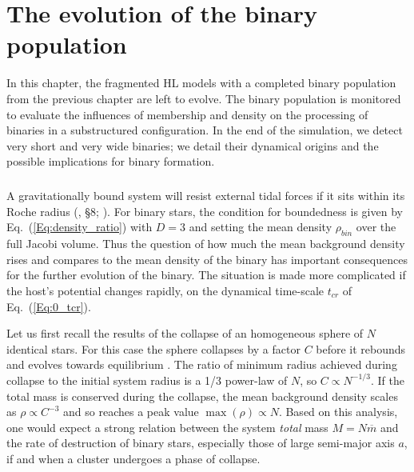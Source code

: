 \chapter{The evolution of the binary population}


In this chapter, the fragmented HL models with a completed binary population from the previous chapter are left to evolve. The binary population is monitored to evaluate the influences of membership and density on the processing of binaries in a substructured configuration. In the end of the simulation, we detect very short and very wide binaries; we detail their dynamical origins and the possible implications for binary formation.

\minitoc


\paragraph*{}

A gravitationally bound system will resist external tidal forces if it sits within its Roche radius (\citealt{BT}, \S8; \citealt{Renaud2011}). For binary stars, the condition for boundedness is given by Eq.~(\ref{Eq:density_ratio})  with $D = 3$ and setting the mean density $\rho_{bin}$ over the full Jacobi volume. Thus the question of how much the mean background density rises and  compares to the mean density of the binary has important consequences for the further evolution of the binary. The situation is made more complicated if the host's potential changes rapidly, on the  dynamical time-scale $t_{cr}$ of Eq.~(\ref{Eq:0_tcr}). 

Let us first recall the results of the collapse of an homogeneous sphere of $N$ identical stars. For this case the sphere collapses by a factor $C$ before it rebounds and evolves towards equilibrium \citep{Aarseth1988,Boily2002}. The ratio of minimum radius achieved during collapse to the initial system radius is a 1/3 power-law of $N$, so $ C \propto N^{-1/3}$. 
If the total mass is conserved during the collapse, the mean background density scales as $\rho \propto C^{-3}$ and so reaches a peak value $\max(\rho) \propto N$. Based on this analysis, one would expect a strong relation between the system {\it total} mass $M = N \overline{m}$ and the rate of destruction of binary stars, especially those of large semi-major axis $a$, if and when a cluster undergoes a phase of collapse.

